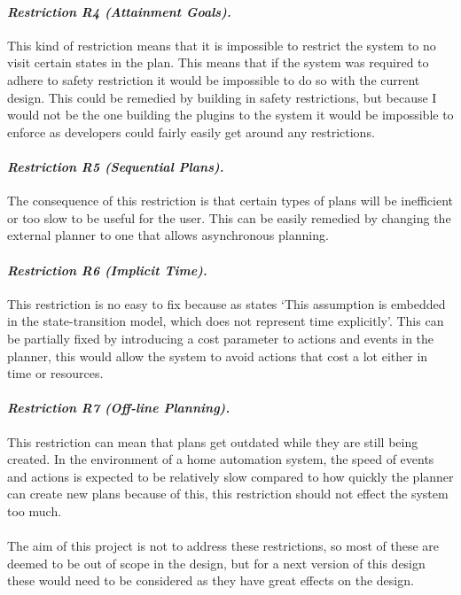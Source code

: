 \paragraph*{\textit{Restriction R4 (Attainment Goals).}} This kind of
restriction means that it is impossible to restrict the system to no visit
certain states in the plan. This means that if the system was required to adhere
to safety restriction it would be impossible to do so with the current design.
This could be remedied by building in safety restrictions, but because I would
not be the one building the plugins to the system it would be impossible to
enforce as developers could fairly easily get around any restrictions.

\paragraph*{\textit{Restriction R5 (Sequential Plans).}} The consequence of this
restriction is that certain types of plans will be inefficient or too slow to be
useful for the user. This can be easily remedied by changing the external
planner to one that allows asynchronous planning.

\paragraph*{\textit{Restriction R6 (Implicit Time).}} This restriction is no
easy to fix because as \cite{Nau2007} states `This assumption is embedded in the
state-transition model, which does not represent time explicitly'. This can be
partially fixed by introducing a cost parameter to actions and events in the
planner, this would allow the system to avoid actions that cost a lot either in
time or resources.

\paragraph*{\textit{Restriction R7 (Off-line Planning).}} This restriction can
mean that plans get outdated while they are still being created. In the
environment of a home automation system, the speed of events and actions is
expected to be relatively slow compared to how quickly the planner can create
new plans because of this, this restriction should not effect the system too
much.

\paragraph*{}
The aim of this project is not to address these restrictions, so most of these
are deemed to be out of scope in the design, but for a next version of this
design these would need to be considered as they have great effects on the
design.


